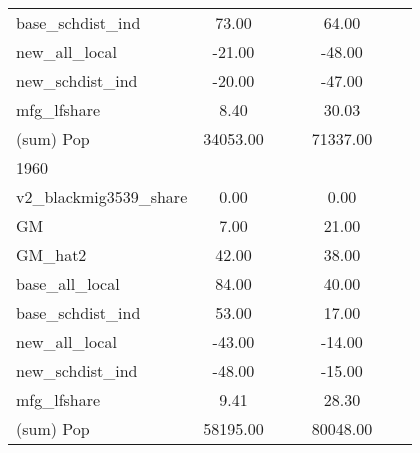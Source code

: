 \begin{table}[htbp]
\begin{tabular}{l*{2}{ccc}}
base\_schdist\_ind    &       73.00&            &            &       64.00&            &            \\
new\_all\_local       &      -21.00&            &            &      -48.00&            &            \\
new\_schdist\_ind     &      -20.00&            &            &      -47.00&            &            \\
mfg\_lfshare         &        8.40&            &            &       30.03&            &            \\
(sum) Pop           &    34053.00&            &            &    71337.00&            &            \\
\midrule
1960                &            &            &            &            &            &            \\
v2\_blackmig3539\_share&        0.00&            &            &        0.00&            &            \\
GM                  &        7.00&            &            &       21.00&            &            \\
GM\_hat2             &       42.00&            &            &       38.00&            &            \\
base\_all\_local      &       84.00&            &            &       40.00&            &            \\
base\_schdist\_ind    &       53.00&            &            &       17.00&            &            \\
new\_all\_local       &      -43.00&            &            &      -14.00&            &            \\
new\_schdist\_ind     &      -48.00&            &            &      -15.00&            &            \\
mfg\_lfshare         &        9.41&            &            &       28.30&            &            \\
(sum) Pop           &    58195.00&            &            &    80048.00&            &            \\
\bottomrule
\end{tabular}
\end{table}
